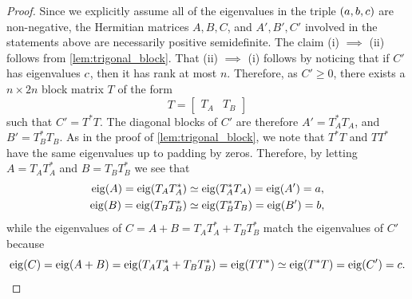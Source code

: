 \documentclass[notitlepage, 10pt]{article}
\begin{document}
\begin{proof}
    Since we explicitly assume all of the eigenvalues in the triple $(a,b,c)$ are non-negative, the Hermitian matrices $A,B,C$, and $A',B',C'$ involved in the statements above are necessarily positive semidefinite.
    The claim (i) $\implies$ (ii) follows from \cref{lem:trigonal_block}.
    That (ii) $\implies$ (i) follows by noticing that if $C'$ has eigenvalues $c$, then it has rank at most $n$.
    Therefore, as $C' \geq 0$, there exists a $n\times 2n$ block matrix $T$ of the form
    \begin{equation}
        T = \begin{bmatrix} T_{A} & T_{B} \end{bmatrix}
    \end{equation}
    such that $C' = T^{*} T$.
    The diagonal blocks of $C'$ are therefore $A' = T_{A}^*T_{A}$, and $B' = T_{B}^{*}T_{B}$.
    As in the proof of \cref{lem:trigonal_block}, we note that $T^{*}T$ and $TT^{*}$ have the same eigenvalues up to padding by zeros.
    Therefore, by letting $A = T_{A} T_{A}^{*}$ and $B = T_{B} T_{B}^*$ we see that
    \begin{align}
        \begin{split}
            \operatorname{eig}(A) = \operatorname{eig}(T_{A} T_{A}^{*}) &\simeq \operatorname{eig}(T_{A}^{*} T_{A}) = \operatorname{eig}(A') = a, \\
            \operatorname{eig}(B) = \operatorname{eig}(T_{B} T_{B}^{*}) &\simeq \operatorname{eig}(T_{B}^{*} T_{B}) = \operatorname{eig}(B') = b,
        \end{split}
    \end{align}
    while the eigenvalues of $C = A+B = T_{A} T_{A}^{*} + T_{B} T_{B}^*$ match the eigenvalues of $C'$ because
    \begin{equation}
        \operatorname{eig}(C) = \operatorname{eig}(A+B) =\operatorname{eig}(T_{A} T_{A}^{*} + T_{B} T_{B}^*) = \operatorname{eig}(T T^{*}) \simeq \operatorname{eig}(T^{*}T) = \operatorname{eig}(C') = c.
    \end{equation}
\end{proof}
\end{document}
